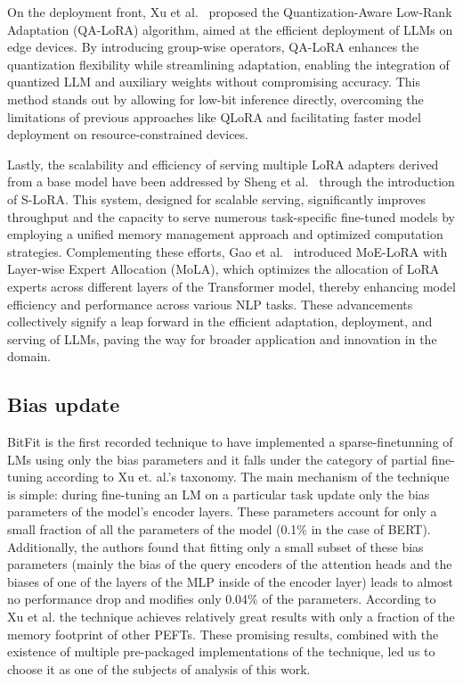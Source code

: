 \documentclass[fleqn,moreauthors,10pt]{ds_report}
\begin{document}
On the deployment front, Xu et al.~\cite{xu2023qalora} proposed the Quantization-Aware Low-Rank Adaptation (QA-LoRA) algorithm, aimed at the efficient deployment of LLMs on edge devices. By introducing group-wise operators, QA-LoRA enhances the quantization flexibility while streamlining adaptation, enabling the integration of quantized LLM and auxiliary weights without compromising accuracy. This method stands out by allowing for low-bit inference directly, overcoming the limitations of previous approaches like QLoRA and facilitating faster model deployment on resource-constrained devices.

Lastly, the scalability and efficiency of serving multiple LoRA adapters derived from a base model have been addressed by Sheng et al.~\cite{sheng2023slora} through the introduction of S-LoRA. This system, designed for scalable serving, significantly improves throughput and the capacity to serve numerous task-specific fine-tuned models by employing a unified memory management approach and optimized computation strategies. Complementing these efforts, Gao et al.~\cite{gao2024higher} introduced MoE-LoRA with Layer-wise Expert Allocation (MoLA), which optimizes the allocation of LoRA experts across different layers of the Transformer model, thereby enhancing model efficiency and performance across various NLP tasks. These advancements collectively signify a leap forward in the efficient adaptation, deployment, and serving of LLMs, paving the way for broader application and innovation in the domain.

\subsection*{Bias update}

BitFit\cite{bitfit} is the first recorded technique to have implemented a sparse-finetunning of LMs using only the bias parameters and it falls under the category of partial fine-tuning according to Xu et. al.'s taxonomy\cite{survey}. The main mechanism of the technique is simple: during fine-tuning an LM on a particular task update only the bias parameters of the model's encoder layers. These parameters account for only a small fraction of all the parameters of the model (0.1\% in the case of BERT). Additionally, the authors found that fitting only a small subset of these bias parameters (mainly the bias of the query encoders of the attention heads and the biases of one of the layers of the MLP inside of the encoder layer) leads to almost no performance drop and modifies only 0.04\% of the parameters. According to Xu et al. \cite{survey} the technique achieves relatively great results with only a fraction of the memory footprint of other PEFTs. These promising results, combined with the existence of multiple pre-packaged implementations of the technique, led us to choose it as one of the subjects of analysis of this work.  
\end{document}
